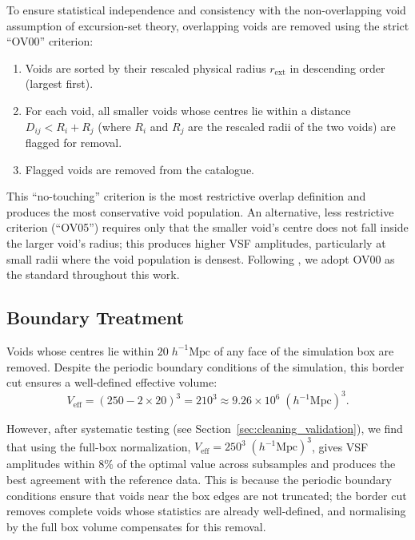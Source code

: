 \documentclass[12pt]{report}
\begin{document}
To ensure statistical independence and consistency with the non-overlapping void assumption of excursion-set theory, overlapping voids are removed using the strict ``OV00'' criterion:

\begin{enumerate}
    \item Voids are sorted by their rescaled physical radius $r_\mathrm{ext}$ in descending order (largest first).
    \item For each void, all smaller voids whose centres lie within a distance $D_{ij} < R_i + R_j$ (where $R_i$ and $R_j$ are the rescaled radii of the two voids) are flagged for removal.
    \item Flagged voids are removed from the catalogue.
\end{enumerate}

This ``no-touching'' criterion is the most restrictive overlap definition and produces the most conservative void population. An alternative, less restrictive criterion (``OV05'') requires only that the smaller void's centre does not fall inside the larger void's radius; this produces higher VSF amplitudes, particularly at small radii where the void population is densest. Following \citet{Sartori2025}, we adopt OV00 as the standard throughout this work.

\subsection{Boundary Treatment}

Voids whose centres lie within $20\;h^{-1}\mathrm{Mpc}$ of any face of the simulation box are removed. Despite the periodic boundary conditions of the simulation, this border cut ensures a well-defined effective volume:
\begin{equation}
    V_\mathrm{eff} = (250 - 2 \times 20)^3 = 210^3 \approx 9.26 \times 10^6\;(h^{-1}\mathrm{Mpc})^3.
\end{equation}

However, after systematic testing (see Section~\ref{sec:cleaning_validation}), we find that using the full-box normalization, $V_\mathrm{eff} = 250^3\;(h^{-1}\mathrm{Mpc})^3$, gives VSF amplitudes within 8\% of the optimal value across subsamples and produces the best agreement with the reference data. This is because the periodic boundary conditions ensure that voids near the box edges are not truncated; the border cut removes complete voids whose statistics are already well-defined, and normalising by the full box volume compensates for this removal.
\end{document}

